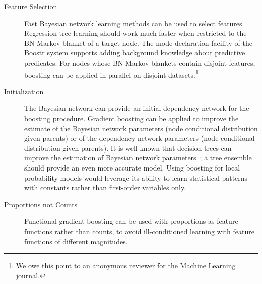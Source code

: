 \documentclass[runningheads,a4paper]{llncs}
\begin{document}
\begin{description}
\item [Feature Selection] Fast Bayesian network learning methods can be used to select features. Regression tree learning should work much faster when restricted to the BN Markov blanket of a target node. The mode declaration facility of the Boostr system supports adding background knowledge about predictive predicates. For nodes whose BN Markov blankets contain disjoint features, boosting can be applied in parallel on disjoint datasets.\footnote{We owe this point to an anonymous reviewer for the Machine Learning journal.}
\item [Initialization] The Bayesian network can provide an initial dependency network for the boosting procedure. 
%
Gradient boosting can be applied to improve the estimate of the Bayesian network parameters (node conditional distribution given parents) or of the dependency network parameters (node conditional distribution given parents). It is well-known that decision trees can improve the estimation of Bayesian network parameters~\cite{Friedman1998}; a tree ensemble should provide an even more accurate model. 
Using boosting for local probability models would leverage its ability to learn statistical patterns with constants rather than first-order variables only.
\item [Proportions not Counts] Functional gradient boosting can be used with proportions as feature functions rather than counts, to avoid ill-conditioned learning with feature functions of different magnitudes. 
\end{description}
\end{document}
